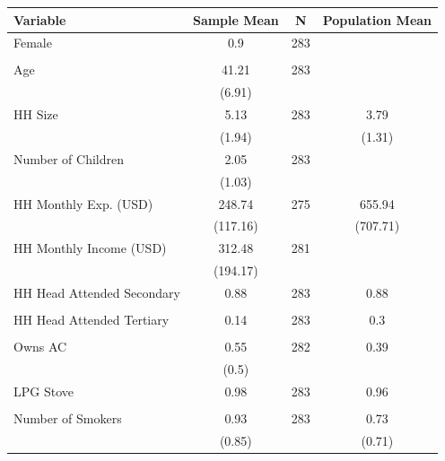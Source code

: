 
\begin{tabular}{lccc}
\toprule
Variable & Sample Mean & N & Population Mean\\
\midrule
Female & 0.9 & 283 & \\
 &  &  \vphantom{3} & \\
Age & 41.21 & 283 & \\
 & (6.91) &  & \\
HH Size & 5.13 & 283 & 3.79\\
 & (1.94) &  & (1.31)\\
Number of Children & 2.05 & 283 & \\
 & (1.03) &  & \\
HH Monthly Exp. (USD) & 248.74 & 275 & 655.94\\
 & (117.16) &  & (707.71)\\
HH Monthly Income (USD) & 312.48 & 281 & \\
 & (194.17) &  & \\
HH Head Attended Secondary & 0.88 & 283 & 0.88\\
 &  &  \vphantom{2} & \\
HH Head Attended Tertiary & 0.14 & 283 & 0.3\\
 &  &  \vphantom{1} & \\
Owns AC & 0.55 & 282 & 0.39\\
 & (0.5) &  & \\
LPG Stove & 0.98 & 283 & 0.96\\
 &  &  & \\
Number of Smokers & 0.93 & 283 & 0.73\\
 & (0.85) &  & (0.71)\\
\midrule
\bottomrule
\end{tabular}
